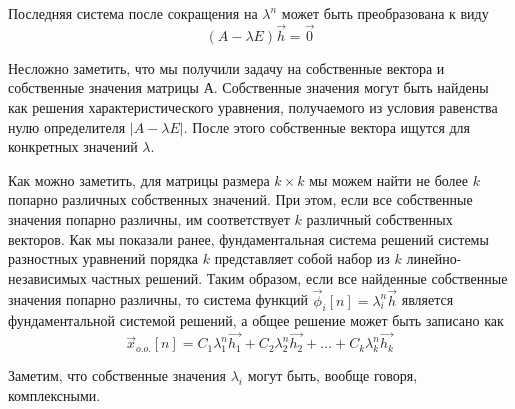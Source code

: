 \documentclass[12pt,twoside]{report}
\theoremstyle{MyNonumberplain}
\begin{document}
    Последняя система после сокращения на $\lambda^n$ может быть преобразована к виду 
    \begin{equation}\label{sysEigenValVec}
        \left(A - \lambda E \right)\vec{h} = \vec{0} 
    \end{equation}
    
    Несложно заметить, что мы получили задачу на собственные вектора и собственные значения матрицы $А$.
    Собственные значения могут быть найдены как решения характеристического уравнения, получаемого 
    из условия равенства нулю определителя $\left|A-\lambda E\right|$.
    После этого собственные вектора ищутся для конкретных значений $\lambda$.

    Как можно заметить, для матрицы размера $k \times k$ мы можем найти не более $k$ попарно различных 
    собственных значений. При этом, если все собственные значения попарно различны, им соответствует $k$
    различный собственных векторов. Как мы показали ранее, фундаментальная система решений системы 
    разностных уравнений порядка $k$ представляет собой набор из $k$ линейно-независимых частных решений.
    Таким образом, если все найденные собственные значения попарно различны, то система функций 
    $\vec{\phi}_i[n]=\lambda_i^n \vec{h}$ является фундаментальной системой решений, а общее решение может 
    быть записано как
    \begin{equation}
        \vec{x}_{o.o.}[n]=C_1\lambda_1^n\vec{h_1}+C_2\lambda_2^n\vec{h_2}+\dots+C_k\lambda_k^n\vec{h_k}
    \end{equation}
    
    Заметим, что собственные значения $\lambda_i$ могут быть, вообще говоря, комплексными.
\end{document}
